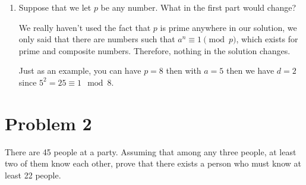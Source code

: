 \documentclass[10pt]{article}
\begin{document}
\begin{enumerate}[1.]
\begin{solution}
        
    \end{solution}
    \item Suppose that we let $p$ be any number. What in the first part would change?
    
    \begin{solution}
        We really haven't used the fact that $p$ is prime anywhere in our solution, we only said that there are numbers such that $a^n \equiv 1 \pmod p$, which exists for prime and composite numbers. Therefore, nothing in the solution changes.

        Just as an example, you can have $p = 8$ then with $a = 5$ then we have $d = 2$ since $5^2 = 25 \equiv 1 \mod 8$.
    \end{solution}
\end{enumerate}


\pagebreak

\section*{Problem 2}

There are 45 people at a party. Assuming that among any three people, at least two of them know each other, prove that there exists a person who must know at least 22 people.
\end{document}
